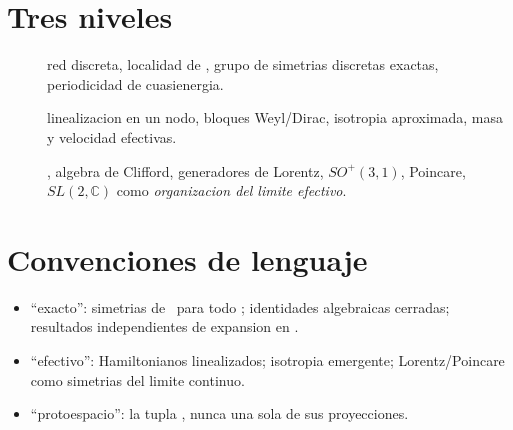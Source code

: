 \section{Tres niveles}

\begin{description}
  \item[\NivelI] red discreta, localidad de \Uop, grupo de simetrias
        discretas exactas, periodicidad de cuasienergia.
  \item[\NivelII] linealizacion en un nodo, bloques Weyl/Dirac, isotropia
        aproximada, masa y velocidad efectivas.
  \item[\NivelIII] \gmu, algebra de Clifford, generadores de Lorentz,
        $SO^+(3,1)$, Poincare, $SL(2,\mathbb{C})$ como \emph{organizacion
        del limite efectivo}.
\end{description}

\section{Convenciones de lenguaje}

\begin{itemize}[leftmargin=*]
  \item \enquote{exacto}: simetrias de \Uop\ para todo \vk; identidades
        algebraicas cerradas; resultados independientes de expansion en \vq.
  \item \enquote{efectivo}: Hamiltonianos linealizados; isotropia emergente;
        Lorentz/Poincare como simetrias del limite continuo.
  \item \enquote{protoespacio}: la tupla \Proto, nunca una sola de sus
        proyecciones.
\end{itemize}
